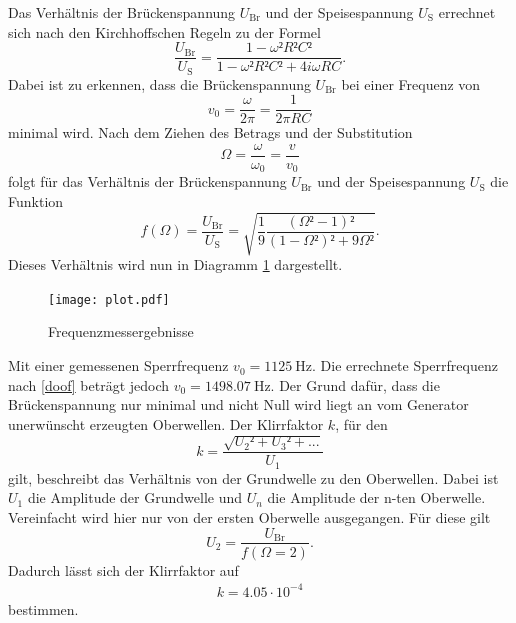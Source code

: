 Das Verhältnis der Brückenspannung $U_{\text{Br}}$ und der Speisespannung $U_{\text{S}}$ errechnet sich nach den Kirchhoffschen Regeln zu der Formel
\begin{equation}
  \frac{U_{\text{Br}}}{U_{\text{S}}} = \frac{1-\omega²R²C²}{1-\omega²R²C²+4i\omega RC}.
\end{equation}
Dabei ist zu erkennen, dass die Brückenspannung $U_{\text{Br}}$ bei einer Frequenz von
\begin{equation}
  v_0 = \frac{\omega}{2 \pi} =\frac{1}{2 \pi RC} \label{doof}
\end{equation}
minimal wird.
Nach dem Ziehen des Betrags und der Substitution
\begin{equation}
  \Omega = \frac{\omega}{\omega_0} = \frac{v}{v_0}
\end{equation}
folgt für das Verhältnis der Brückenspannung $U_{\text{Br}}$ und der Speisespannung $U_{\text{S}}$ die Funktion
\begin{equation}
  f(\Omega) = \frac{U_{\text{Br}}}{U_{\text{S}}} = \sqrt{\frac{1}{9} \frac{\left(\Omega²-1 \right)²}{\left(1-\Omega² \right)²+9\Omega²}}.
\end{equation}
Dieses Verhältnis wird nun in Diagramm \ref{fig:6} dargestellt.

\begin{figure}[H]
  \centering
  \texttt{[image: plot.pdf]}
  \caption{Frequenzmessergebnisse}
  \label{fig:6}
\end{figure}

Mit einer gemessenen Sperrfrequenz $v_0 = \SI{1125}{\hertz}$.
Die errechnete Sperrfrequenz nach \ref{doof} beträgt jedoch $v_0 = \SI{1498.07}{\hertz}$.
Der Grund dafür, dass die Brückenspannung nur minimal und nicht Null wird liegt an vom Generator unerwünscht erzeugten Oberwellen.
Der Klirrfaktor $k$, für den
\begin{equation}
    k = \frac{\sqrt{U_2²+U_3²+...}}{U_1}
\end{equation}
gilt, beschreibt das Verhältnis von der Grundwelle zu den Oberwellen.
Dabei ist $U_1$ die Amplitude der Grundwelle und $U_{n}$ die Amplitude der n-ten Oberwelle.
Vereinfacht wird hier nur von der ersten Oberwelle ausgegangen.
Für diese gilt
\begin{equation}
  U_2 = \frac{U_{\text{Br}}}{f(\Omega = 2)}.
\end{equation}
Dadurch lässt sich der Klirrfaktor auf
\begin{align}
  k = 4.05 \cdot 10^{-4}
\end{align}
bestimmen.
